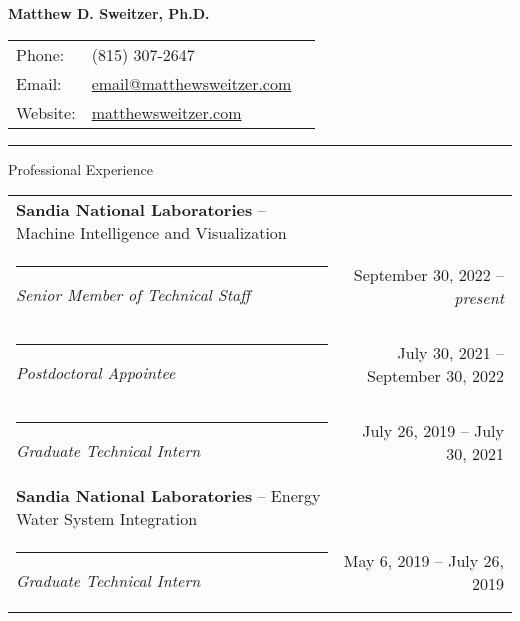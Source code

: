 \documentclass[letterpaper, 10pt]{extarticle}
\def\name{Matthew D. Sweitzer, Ph.D.}
\begin{document}
\begin{center}
{\Large \textbf{\name}}
\end{center}

\vspace{0.5em}

\begin{tabularx}{\textwidth}{lXr}
Phone: & (815) 307-2647 &\\
Email: & \href{mailto:email@matthewsweitzer.com}{email@matthewsweitzer.com} &\\
Website: & \href{https://www.matthewsweitzer.com}{matthewsweitzer.com} &\\
\end{tabularx}

\vspace{0.5em}
\rule{\textwidth}{0.75pt}



\vspace{1em}
{\large Professional Experience}

\vspace{0.5em}
\raggedright
\begin{tabularx}{\textwidth}{Xr}
\textbf{Sandia National Laboratories} -- Machine Intelligence and Visualization\\
\rule{0.75em}{0pt}\textit{Senior Member of Technical Staff} & September 30, 2022 -- \textit{present}\\
\rule{0.75em}{0pt}\textit{Postdoctoral Appointee} & July 30, 2021 -- September 30, 2022\\
\rule{0.75em}{0pt}\textit{Graduate Technical Intern} & July 26, 2019 -- July 30, 2021\\
\vspace{0.5em}
\textbf{Sandia National Laboratories} -- Energy Water System Integration\\
\rule{0.75em}{0pt}\textit{Graduate Technical Intern} & May 6, 2019 -- July 26, 2019\\
\end{tabularx}
\end{document}

